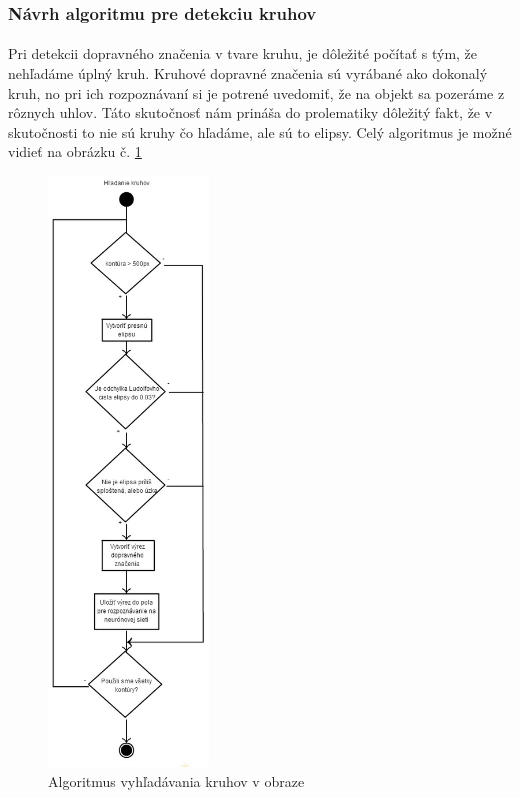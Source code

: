 \documentclass[12pt]{article}
\begin{document}
\subsubsection{Návrh algoritmu pre detekciu kruhov}
\paragraph{}
Pri detekcii dopravného značenia v tvare kruhu, je dôležité počítať s tým, že nehľadáme úplný kruh. Kruhové dopravné značenia sú vyrábané ako dokonalý kruh,
no pri ich rozpoznávaní si je potrené uvedomiť, že na objekt sa pozeráme z rôznych uhlov. Táto skutočnosť nám prináša do prolematiky dôležitý fakt,
že v skutočnosti to nie sú kruhy čo hľadáme, ale sú to elipsy. Celý algoritmus je možné vidieť na obrázku č. \ref{hladanie_kruhov}
\begin{figure}[p]
\centering
\includegraphics[width=0.38\textwidth,natwidth=318,natheight=1164]{hladanie_kruhov.jpg}
\vspace{-20pt}
\caption{Algoritmus vyhľadávania kruhov v obraze}
\vspace{-10pt}
\label{hladanie_kruhov}
\end{figure}
\end{document}
